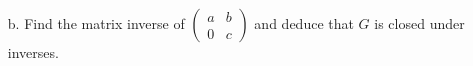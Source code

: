 \documentclass[10pt]{article}
\begin{document}
\begin{itemize}
\begin{itemize}
(Baggett) \ \begin{center}
				$\begin{pmatrix}a_1 & b_1 \\ 0 & c_1\end{pmatrix}\begin{pmatrix}a_2 & b_2 \\ 0 & c_2\end{pmatrix}
				= \begin{pmatrix}a_1a_2 & a_1b_2 + b_1c_2 \\ 0 & c_1c_2\end{pmatrix}$
		\end{center}
	Since $a_1 \neq 0$ and $a_2 \neq 0$, $a_1a_2 \neq 0$; similarly, since $c_1 \neq 0$
	and $c_2 \neq 0$, $c_1c_2 \neq 0$. Thus,
	$\begin{pmatrix}a_2 & b_2 \\ 0 & c_2\end{pmatrix}\begin{pmatrix}a_2 & b_2 \\ 0 & c_2\end{pmatrix}
	\in G$, and $G$ is closed under matrix multiplication.
	
	\item[b.] Find the matrix inverse of $\begin{pmatrix}a & b \\ 0 & c\end{pmatrix}$ and
	deduce that $G$ is closed under inverses.



\end{itemize}
\end{itemize}
\end{document}
